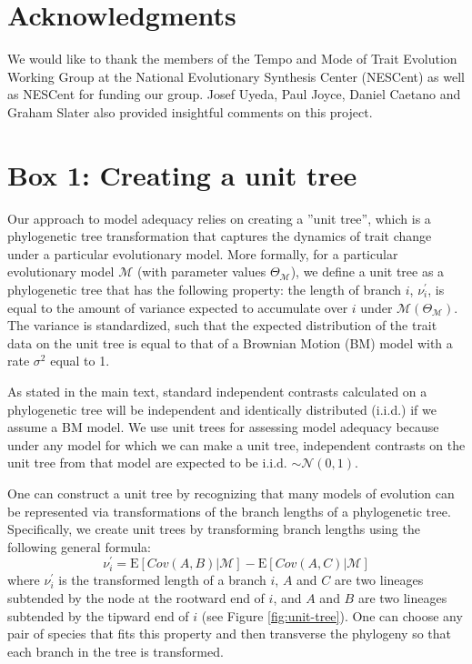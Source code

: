 \documentclass[a4paper,12pt]{article}
\begin{document}
\section{Acknowledgments}
We would like to thank the members of the Tempo and Mode of Trait Evolution Working Group at the National Evolutionary Synthesis Center (NESCent) as well as NESCent for funding our group. Josef Uyeda, Paul Joyce, Daniel Caetano and Graham Slater also provided insightful comments on this project.

\newpage
\section{Box 1: Creating a unit tree}

Our approach to model adequacy relies on creating a ''unit tree'', which is a phylogenetic tree transformation that captures the dynamics of trait change under a particular evolutionary model. More formally, for a particular evolutionary model $\mathcal{M}$ (with parameter values $\Theta_{\mathcal{M}}$), we define a unit tree as a phylogenetic tree that has the following property: the length of branch $i$, $\nu_i ^\prime$, is equal to the amount of variance expected to accumulate over $i$ under $\mathcal{M}(\Theta_{\mathcal{M}})$. The variance is standardized, such that the expected distribution of the trait data on the unit tree is equal to that of a Brownian Motion (BM) model with a rate $\sigma^2$ equal to 1. 

As stated in the main text, standard independent contrasts calculated on a phylogenetic tree will be independent and identically distributed (i.i.d.) if we assume a BM model. We use unit trees for assessing model adequacy because under any model for which we can make a unit tree, independent contrasts on the unit tree from that model are expected to be i.i.d. $\sim \mathcal{N}(0,1)$.

One can construct a unit tree by recognizing that many models of evolution can be represented via transformations of the branch lengths of a phylogenetic tree. Specifically, we create unit trees by transforming branch lengths using the following general formula:
\begin{equation}
\nu_i^\prime = \mathrm{E}[Cov(A,B)|\mathcal{M}] - \mathrm{E}[Cov(A,C)|\mathcal{M}]
\end{equation}
where $\nu_i^\prime$ is the transformed length of a branch $i$, $A$ and $C$ are two lineages subtended by the node at the rootward end of $i$, and $A$ and $B$ are two lineages subtended by the tipward end of $i$ (see Figure \ref{fig:unit-tree}). One can choose any pair of species that fits this property and then transverse the phylogeny so that each branch in the tree is transformed. 
\end{document}
